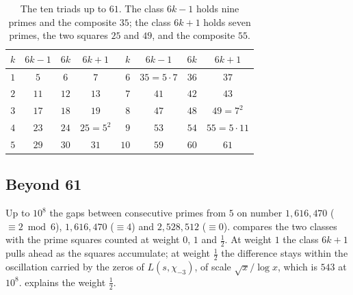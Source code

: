 \documentclass[11pt]{article}
\theoremstyle{definition}\newtheorem{definition}[theorem]{Definition}
\theoremstyle{remark}\newtheorem{remark}[theorem]{Remark}
\theoremstyle{definition}\newtheorem{axiom}{Axiom}
\begin{document}
\begin{table}[!htbp]\centering\small
\begin{tabular}{@{}rccc|rccc@{}}\toprule
$k$ & $6k-1$ & $6k$ & $6k+1$ & $k$ & $6k-1$ & $6k$ & $6k+1$\\\midrule
$1$ & $5$ & $6$ & $7$ & $6$ & $35=5\cdot7$ & $36$ & $37$\\
$2$ & $11$ & $12$ & $13$ & $7$ & $41$ & $42$ & $43$\\
$3$ & $17$ & $18$ & $19$ & $8$ & $47$ & $48$ & $49=7^2$\\
$4$ & $23$ & $24$ & $25=5^2$ & $9$ & $53$ & $54$ & $55=5\cdot11$\\
$5$ & $29$ & $30$ & $31$ & $10$ & $59$ & $60$ & $61$\\\bottomrule
\end{tabular}
\caption{The ten triads up to $61$. The class $6k-1$ holds nine primes and the composite $35$; the class $6k+1$ holds seven primes, the two squares $25$ and $49$, and the composite $55$.}\label{tab:triads}
\end{table}

\subsection{Beyond 61}

Up to $10^8$ the gaps between consecutive primes from $5$ on number $1{,}616{,}470$ ($\equiv2\bmod6$), $1{,}616{,}470$ ($\equiv4$) and $2{,}528{,}512$ ($\equiv0$).  compares the two classes with the prime squares counted at weight $0$, $1$ and $\frac12$. At weight $1$ the class $6k+1$ pulls ahead as the squares accumulate; at weight $\frac12$ the difference stays within the oscillation carried by the zeros of $L(s,\chi_{-3})$, of scale $\sqrt x/\log x$, which is $543$ at $10^8$.  explains the weight $\frac12$.
\end{document}
